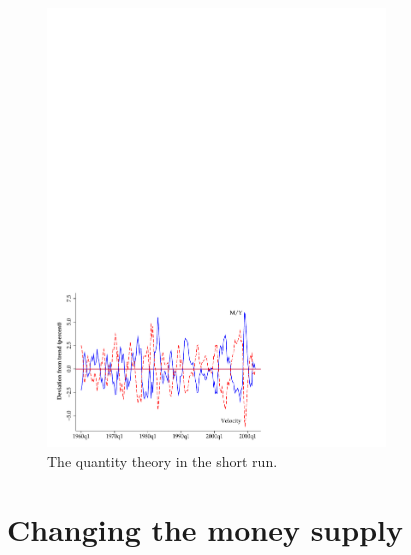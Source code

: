 
\begin{figure}[h]
    \caption{The quantity theory in the short run.}
    \label{fig:quantity_short}
    \centering
    \includegraphics[width=0.8\textwidth]{Figures/short_1.pdf}
\end{figure}



\section{Changing the money supply}

